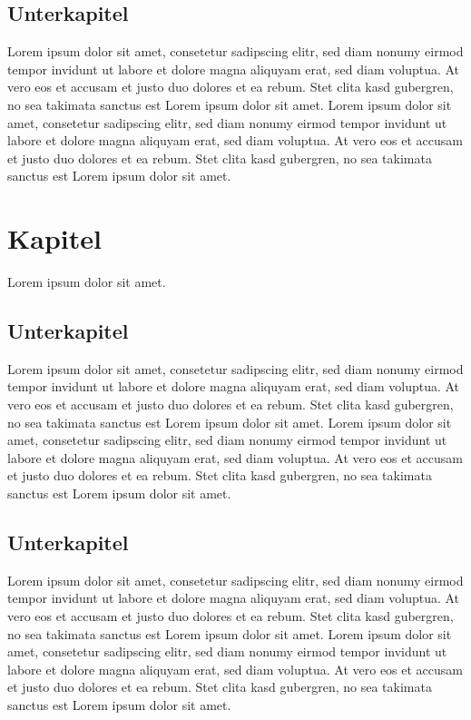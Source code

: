 \documentclass[12pt,a4paper,bibliography=totocnumbered,listof=totocnumbered]{scrartcl}
\begin{document}
\subsection{Unterkapitel}
Lorem ipsum dolor sit amet, consetetur sadipscing elitr, sed diam nonumy eirmod tempor invidunt ut labore et dolore magna aliquyam erat, sed diam voluptua. At vero eos et accusam et justo duo dolores et ea rebum. Stet clita kasd gubergren, no sea takimata sanctus est Lorem ipsum dolor sit amet. Lorem ipsum dolor sit amet, consetetur sadipscing elitr, sed diam nonumy eirmod tempor invidunt ut labore et dolore magna aliquyam erat, sed diam voluptua. At vero eos et accusam et justo duo dolores et ea rebum. Stet clita kasd gubergren, no sea takimata sanctus est Lorem ipsum dolor sit amet.
\pagebreak

\section{Kapitel}
Lorem ipsum dolor sit amet.

\subsection{Unterkapitel}
Lorem ipsum dolor sit amet, consetetur sadipscing elitr, sed diam nonumy eirmod tempor invidunt ut labore et dolore magna aliquyam erat, sed diam voluptua. At vero eos et accusam et justo duo dolores et ea rebum. Stet clita kasd gubergren, no sea takimata sanctus est Lorem ipsum dolor sit amet. Lorem ipsum dolor sit amet, consetetur sadipscing elitr, sed diam nonumy eirmod tempor invidunt ut labore et dolore magna aliquyam erat, sed diam voluptua. At vero eos et accusam et justo duo dolores et ea rebum. Stet clita kasd gubergren, no sea takimata sanctus est Lorem ipsum dolor sit amet.

\subsection{Unterkapitel}
Lorem ipsum dolor sit amet, consetetur sadipscing elitr, sed diam nonumy eirmod tempor invidunt ut labore et dolore magna aliquyam erat, sed diam voluptua. At vero eos et accusam et justo duo dolores et ea rebum. Stet clita kasd gubergren, no sea takimata sanctus est Lorem ipsum dolor sit amet. Lorem ipsum dolor sit amet, consetetur sadipscing elitr, sed diam nonumy eirmod tempor invidunt ut labore et dolore magna aliquyam erat, sed diam voluptua. At vero eos et accusam et justo duo dolores et ea rebum. Stet clita kasd gubergren, no sea takimata sanctus est Lorem ipsum dolor sit amet.
\pagebreak
\end{document}
